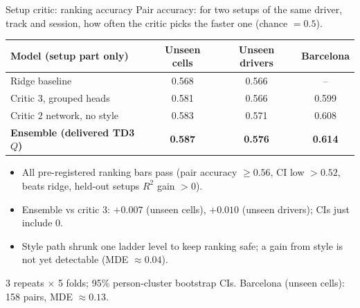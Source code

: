 \documentclass[aspectratio=169,10pt]{beamer}
\newcommand{\smallnote}[1]{{\footnotesize\color{gray}#1}}
\begin{document}
\begin{frame}[shrink=8]{Setup critic: ranking accuracy}
\small Pair accuracy: for two setups of the same driver, track and session, how often the critic picks the faster one (chance $=0.5$).
\vspace{2mm}

\begin{tabularx}{\textwidth}{@{}Xccc@{}}
\toprule
Model (setup part only) & Unseen cells & Unseen drivers & Barcelona\\
\midrule
Ridge baseline & 0.568 & 0.566 & --\\
Critic 3, grouped heads & 0.581 & 0.566 & 0.599\\
Critic 2 network, no style & 0.583 & 0.571 & 0.608\\
\textbf{Ensemble (delivered TD3 $Q$)} & \textbf{0.587} & \textbf{0.576} & \textbf{0.614}\\
\bottomrule
\end{tabularx}
\vspace{3mm}
\begin{itemize}\setlength\itemsep{1mm}\small
\item All pre-registered ranking bars pass (pair accuracy $\ge 0.56$, CI low $>0.52$, beats ridge, held-out setups $R^2$ gain $>0$).
\item Ensemble vs critic 3: $+0.007$ (unseen cells), $+0.010$ (unseen drivers); CIs just include 0.
\item Style path shrunk one ladder level to keep ranking safe; a gain from style is not yet detectable (MDE $\approx 0.04$).
\end{itemize}
\smallnote{3 repeats $\times$ 5 folds; 95\% person-cluster bootstrap CIs. Barcelona (unseen cells): 158 pairs, MDE $\approx 0.13$.}
\end{frame}
\end{document}
